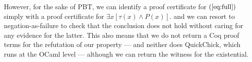 %
However, for the sake of PBT, we can identify a proof certificate for
$(\ref{eq:full})$ simply with a proof certificate for
$
  \exists x [\tau(x)\wedge P(x)].
$
and we can resort to negation-as-failure to check that the conclusion does not hold without caring for any evidence for the latter. This also means that we do not return a Coq proof terms for the refutation of our property --- and neither does \textsf{QuickChick}, which runs at the OCaml level --- although we can return the witness for the existential.
%


